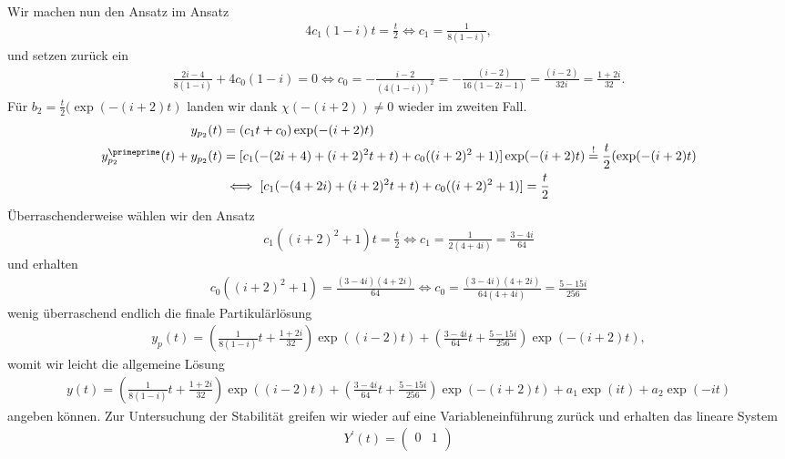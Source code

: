 \begin{solution}
\begin{enumerate}[label = \textbf{\alph*)}]
\begin{align*}
  \end{align*}
  Wir machen nun den Ansatz im Ansatz
  \begin{align*}
    4c_1(1-i)t = \frac{t}{2} \iff c_1 = \frac{1}{8(1-i)},
  \end{align*}
  und setzen zurück ein
  \begin{align*}
    \frac{2i-4}{8(1-i)} + 4c_0(1-i) = 0
    \iff c_0 = - \frac{i-2}{(4(1-i))^2} = - \frac{(i-2)}{16(1-2i-1)}
    = \frac{(i-2)}{32i} = \frac{1 + 2i}{32}.
  \end{align*}
  Für $b_2 = \frac{t}{2}(\exp(-(i+2)t)$ landen wir dank $\chi(-(i+2)) \neq 0$
  wieder im zweiten Fall.
  \begin{align*}
    y_{p_2}(t) &= (c_1t + c_0)\exp(-(i+2)t) \\
    y_{p_2}^{\primeprime}(t) + y_{p_2}(t) &=
    [c_1(-(2i+4) + (i + 2)^2t + t) + c_0((i + 2)^2 + 1)]\exp(-(i+2)t)
    \stackrel{!}{=} \frac{t}{2}(\exp(-(i+2)t) \\\
    &\iff [c_1(-(4 + 2i) + (i + 2)^2t + t) + c_0((i + 2)^2 + 1)] = \frac{t}{2}
  \end{align*}
  Überraschenderweise wählen wir den Ansatz
  \begin{align*}
    c_1((i + 2)^2+1)t = \frac{t}{2} \iff c_1 = \frac{1}{2(4 + 4i)} = \frac{3 - 4i}{64}
  \end{align*}
  und erhalten
  \begin{align*}
    c_0((i + 2)^2 + 1) = \frac{(3 - 4i)(4+2i)}{64}
    \iff c_0 = \frac{(3 - 4i)(4+2i)}{64(4 + 4i)} = \frac{5 - 15i}{256}
  \end{align*}
  wenig überraschend endlich die finale Partikulärlösung
  \begin{align*}
    y_p(t) = \left(\frac{1}{8(1-i)}t + \frac{1 + 2i}{32}\right)\exp((i-2)t) +
    \left(\frac{3 - 4i}{64}t + \frac{5 - 15i}{256}\right)\exp(-(i+2)t),
  \end{align*}
  womit wir leicht die allgemeine Lösung
  \begin{align*}
  y(t) = \left(\frac{1}{8(1-i)}t + \frac{1 + 2i}{32}\right)\exp((i-2)t) +
  \left(\frac{3 - 4i}{64}t + \frac{5 - 15i}{256}\right)\exp(-(i+2)t) +
  a_1\exp(it) + a_2\exp(-it)
  \end{align*}
  angeben können.
  Zur Untersuchung der Stabilität greifen wir wieder auf eine Variableneinführung
  zurück und erhalten das lineare System
  \begin{align*}
    Y^{\prime}(t) = \begin{pmatrix}
      0 & 1 \\

\end{pmatrix}
\end{align*}
\end{enumerate}
\end{solution}
